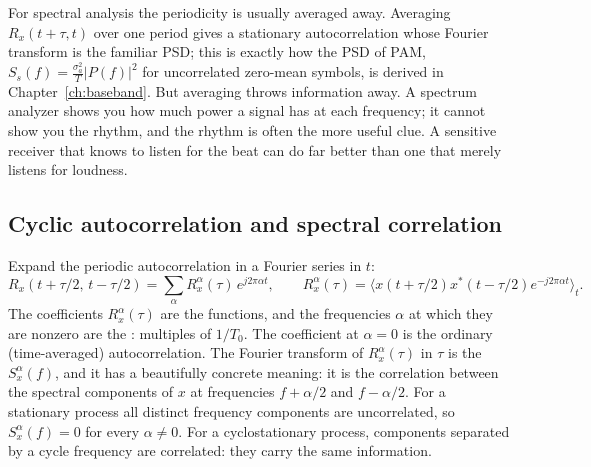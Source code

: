 For spectral analysis the periodicity is usually averaged away. Averaging $R_x(t+\tau,t)$ over one
period gives a stationary autocorrelation whose Fourier transform is the familiar PSD; this is exactly
how the PSD of PAM, $S_s(f)=\frac{\sigma_a^2}{T}|P(f)|^2$ for uncorrelated zero-mean symbols, is derived
in Chapter~\ref{ch:baseband}. But averaging throws information away. A spectrum analyzer shows you how
much power a signal has at each frequency; it cannot show you the rhythm, and the rhythm is often the
more useful clue. A sensitive receiver that knows to listen for the beat can do far better than one
that merely listens for loudness.

\subsection{Cyclic autocorrelation and spectral correlation}

Expand the periodic autocorrelation in a Fourier series in $t$:
\begin{equation}
R_x(t+\tau/2,\,t-\tau/2)=\sum_{\alpha}R_x^{\alpha}(\tau)\,e^{j2\pi\alpha t},\qquad
R_x^{\alpha}(\tau)=\big\langle x(t+\tau/2)x^*(t-\tau/2)e^{-j2\pi\alpha t}\big\rangle_t .
\label{eq:ch03:cyclicac}
\end{equation}
The coefficients $R_x^\alpha(\tau)$ are the  functions, and the
frequencies $\alpha$ at which they are nonzero are the : multiples of $1/T_0$.
The coefficient at $\alpha=0$ is the ordinary (time-averaged) autocorrelation. The Fourier transform of
$R_x^\alpha(\tau)$ in $\tau$ is the  $S_x^\alpha(f)$, and it has a
beautifully concrete meaning: it is the correlation between the spectral components of $x$ at
frequencies $f+\alpha/2$ and $f-\alpha/2$. For a stationary process all distinct frequency components
are uncorrelated, so $S_x^\alpha(f)=0$ for every $\alpha\ne0$. For a cyclostationary process,
components separated by a cycle frequency are correlated: they carry the same information.


